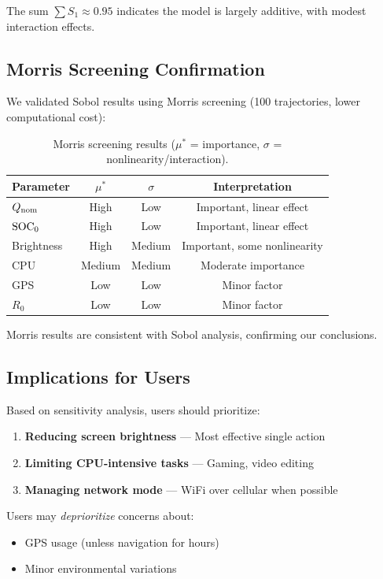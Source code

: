 The sum $\sum S_1 \approx 0.95$ indicates the model is largely additive, with modest interaction effects.

\subsection{Morris Screening Confirmation}
\label{subsec:morris}

We validated Sobol results using Morris screening (100 trajectories, lower computational cost):

\begin{table}[H]
    \centering
    \caption{Morris screening results ($\mu^*$ = importance, $\sigma$ = nonlinearity/interaction).}
    \label{tab:morris}
    \begin{tabular}{lccc}
        \toprule
        \textbf{Parameter} & $\mu^*$ & $\sigma$ & \textbf{Interpretation} \\
        \midrule
        $Q_{\text{nom}}$ & High & Low & Important, linear effect \\
        $\text{SOC}_0$ & High & Low & Important, linear effect \\
        Brightness & High & Medium & Important, some nonlinearity \\
        CPU & Medium & Medium & Moderate importance \\
        GPS & Low & Low & Minor factor \\
        $R_0$ & Low & Low & Minor factor \\
        \bottomrule
    \end{tabular}
\end{table}

Morris results are consistent with Sobol analysis, confirming our conclusions.

\subsection{Implications for Users}
\label{subsec:user_implications}

Based on sensitivity analysis, users should prioritize:

\begin{enumerate}
    \item \textbf{Reducing screen brightness} --- Most effective single action
    \item \textbf{Limiting CPU-intensive tasks} --- Gaming, video editing
    \item \textbf{Managing network mode} --- WiFi over cellular when possible
\end{enumerate}

Users may \textit{deprioritize} concerns about:
\begin{itemize}
    \item GPS usage (unless navigation for hours)
    \item Minor environmental variations
\end{itemize}

